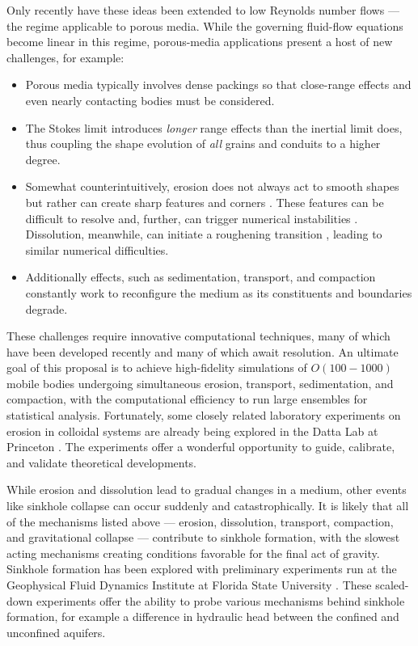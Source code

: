 \documentclass[12pt]{article}
\begin{document}
Only recently have these ideas been extended to low Reynolds number flows  \cite{mitchell2017generalized, Quaife2018} --- the regime applicable to porous media. While the governing fluid-flow equations become linear in this regime, porous-media applications present a host of new challenges, for example:
\begin{itemize}
\item Porous media typically involves dense packings so that close-range effects and even nearly contacting bodies must be considered.
\item The Stokes limit introduces {\em longer} range effects than the inertial limit does, thus coupling the shape evolution of {\em all} grains and conduits to a higher degree.
\item Somewhat counterintuitively, erosion does not always act to smooth shapes but rather can create sharp features and corners \cite{Ristroph2012}. These features can be difficult to resolve and, further, can trigger numerical instabilities \cite{Quaife2018}. Dissolution, meanwhile, can initiate a roughening transition \cite{claudin2017dissolution}, leading to similar numerical difficulties.
\item Additionally effects, such as sedimentation, transport, and compaction constantly work to reconfigure the medium as its constituents and boundaries degrade.
\end{itemize}
These challenges require innovative computational techniques, many of which have been developed recently \cite{Quaife2018} and many of which await resolution. An ultimate goal of this proposal is to achieve high-fidelity simulations of $O(100-1000)$ mobile bodies undergoing simultaneous erosion, transport, sedimentation, and compaction, with the computational efficiency to run large ensembles for statistical analysis.
Fortunately, some closely related laboratory experiments on erosion in colloidal systems are already being explored in the Datta Lab at Princeton \cite{bizmark2019multiscale}. The experiments offer a wonderful opportunity to guide, calibrate, and validate theoretical developments.

While erosion and dissolution lead to gradual changes in a medium, other events like sinkhole collapse can occur suddenly and catastrophically. It is likely that all of the mechanisms listed above --- erosion, dissolution, transport, compaction, and gravitational collapse --- contribute to sinkhole formation, with the slowest acting mechanisms creating conditions favorable for the final act of gravity. Sinkhole formation has been explored with preliminary experiments run at the Geophysical Fluid Dynamics Institute at Florida State University \cite{tao2014experimental}. These scaled-down experiments offer the ability to probe various mechanisms behind sinkhole formation, for example a difference in hydraulic head between the confined and unconfined aquifers. 
\end{document}
